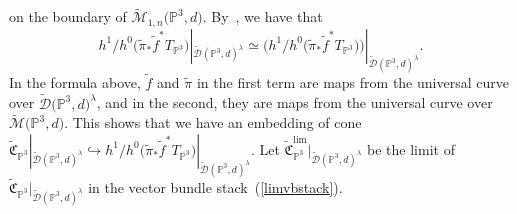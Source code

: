 \documentclass[pdftex]{sigma}
\numberwithin{equation}{section}
\newcommand{\PP}{\mathbb P}
\begin{document}
\begin{Remark}
on the boundary of $\widetilde{\mathcal{M}}_{1,n}\big(\PP^3,d\big)$. By~\cite{HL}, we have that
\[
h^1/h^0\big(\widetilde{\pi}_*\widetilde{f}^*T_{\PP^3}\big)|_{\widetilde{\mathcal{D}}(\PP^3,d)^{\lambda}}\simeq \big(h^1/h^0\big(\widetilde{\pi}_*\widetilde{f}^*T_{\PP^3}\big)\big)|_{\widetilde{\mathcal{D}} (\PP^3,d)^{\lambda}}.
\]
In the formula above, $\widetilde{f}$ and $\widetilde{\pi}$ in the first term are maps from the universal curve over $\widetilde{\mathcal{D}}\big(\PP^3,d\big)^{\lambda}$, and in the second, they are maps from the universal curve over $\widetilde{\mathcal{M}}\big(\PP^3,d\big)$. This shows that we have an embedding of cone $\widetilde{\mathfrak{C}}_{\PP^3}|_{\widetilde{\mathcal{D}}(\PP^3,d)^{\lambda}}\hookrightarrow h^1/h^0\big(\widetilde{\pi}_*\widetilde{f}^*T_{\PP^3}\big)|_{\widetilde{\mathcal{D}}(\PP^3,d)^{\lambda}}$. Let $\widetilde{\mathfrak{C}}_{\PP^3}^{\mathrm{lim}}|_{\widetilde{\mathcal{D}}(\PP^3,d)^{\lambda}}$ be the limit of $\widetilde{\mathfrak{C}}_{\PP^3}|_{\widetilde{\mathcal{D}}(\PP^3,d)^{\lambda}}$ in the vector bundle stack~(\ref{limvbstack}).


\end{Remark}
\end{document}
